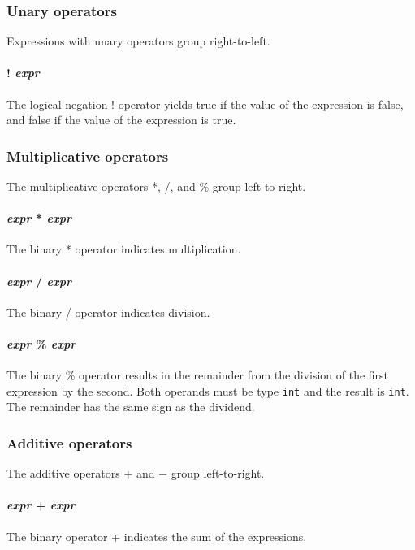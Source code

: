\subsubsection{Unary operators}
Expressions with unary operators group right-to-left.

\paragraph{! \textit{expr}}
The logical negation ! operator yields true if the value of the expression is false, and false if the value of the expression is true. 

\subsubsection{Multiplicative operators}
The multiplicative operators *, /, and \% group left-to-right.

\paragraph{\textit{expr} * \textit{expr}}
The binary * operator indicates multiplication.

\paragraph{\textit{expr} / \textit{expr}}
The binary / operator indicates division.

\paragraph{\textit{expr} \% \textit{expr}}
The  binary \% operator results in the remainder from the division of the first expression by the second. Both operands must be type \texttt{int} and the result is \texttt{int}. The remainder has the same sign as the dividend.
\\
\subsubsection{Additive operators}
The additive operators $+$ and $-$ group left-to-right.

\paragraph{\textit{expr} + \textit{expr}}
The binary  operator + indicates the sum of the expressions.

